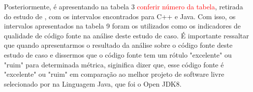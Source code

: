 Posteriormente, é apresentando na tabela 3 \textcolor{red}{conferir número da tabela}, retirada do
estudo de , com os intervalos encontrados para C++ e Java. Com isso, os intervalos apresentados na tabela 9 foram os utilizados como os indicadores
de qualidade de código fonte na análise deste estudo de caso. É importante ressaltar que quando apresentarmos o resultado da análise sobre o código fonte deste estudo de caso e dissermos que o código fonte tem um rótulo "excelente" ou "ruim" para determinada métrica, siginifica dizer que, esse código fonte é "excelente" ou "ruim" em comparação ao melhor projeto de software livre selecionado por  na Linguagem Java, que foi o Open JDK8.

 \vspace{\onelineskip} 
 \vspace{\onelineskip} 
 \vspace{\onelineskip} 
 \vspace{\onelineskip} 
 \vspace{\onelineskip} 

